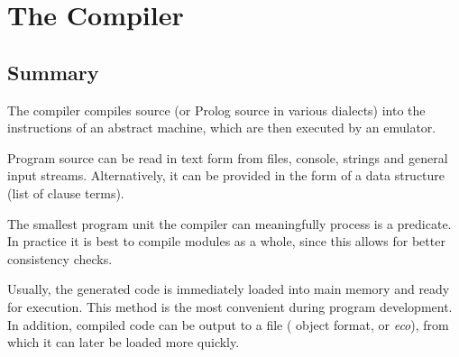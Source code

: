 %
%
%
%
%
%
%
%
%
\chapter{The Compiler}
\label{chapcompiler}

\section{Summary}
The {\eclipse} compiler compiles {\eclipse} source (or Prolog source in
various dialects) into the instructions of an abstract machine, which
are then executed by an emulator.

Program source can be read in text form from files, console,
strings and general input streams.  Alternatively, it can be provided
in the form of a data structure (list of clause terms).

The smallest program unit the compiler can meaningfully process is a
predicate. In practice it is best to compile modules as a whole, since
this allows for better consistency checks.

Usually, the generated code is immediately loaded into main memory and
ready for execution.
This method is the most convenient during program development.
In addition, compiled code can be output to a file ({\eclipse}
object format, or {\it eco}), from which it can later be loaded more quickly.

